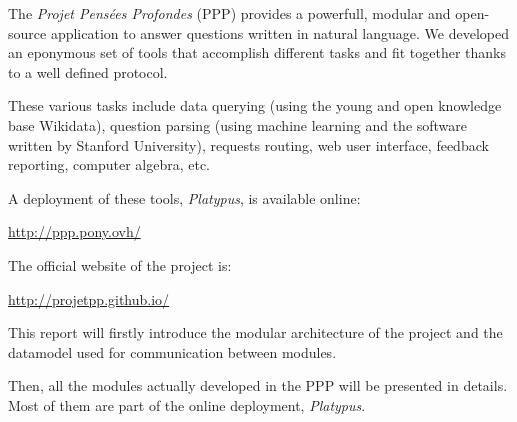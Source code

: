 The \emph{Projet Pensées Profondes} (PPP) provides a powerfull,
modular and open-source application to answer questions written in natural language.
We developed an eponymous set of tools that accomplish different tasks and fit
together thanks to a well defined protocol.

These various tasks include data querying (using the young and open
knowledge base Wikidata), question parsing (using machine learning and the
\CoreNLP software written by Stanford University),
requests routing, web user interface, feedback reporting, computer algebra, etc.

A deployment of these tools, \emph{Platypus}, is available online:

\begin{center}
    \url{http://ppp.pony.ovh/}
\end{center}

The official website of the project is:

\begin{center}
    \url{http://projetpp.github.io/}
\end{center}

\medbreak

This report will firstly introduce the modular architecture of the
project and the datamodel used for communication between modules.

Then, all the modules actually developed in the PPP will be presented in details. Most of
them are part of the online deployment, \emph{Platypus}.
